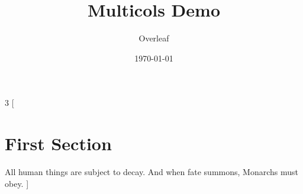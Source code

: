 \documentclass{article}
\title{Multicols Demo}
\author{Overleaf}
\date{\today}
\begin{document}
\maketitle

\begin{multicols}{3}
[
\section{First Section}
All human things are subject to decay. And when fate summons, Monarchs must obey.
]
\blindtext\blindtext
\end{multicols}
\end{document}
